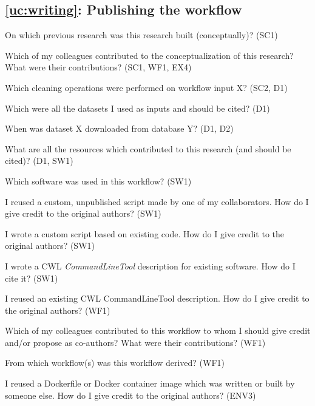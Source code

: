 \subsection{\ref{uc:writing}: Publishing the workflow}
\begin{provquestions}[resume]
    \item On which previous research was this research built (conceptually)? (SC1)
    \item Which of my colleagues contributed to the conceptualization of this research? What were their contributions? (SC1, WF1, EX4)
    \item Which cleaning operations were performed on workflow input X? (SC2, D1)
    \item Which were all the datasets I used as inputs and should be cited? (D1)
    \item When was dataset X downloaded from database Y? (D1, D2)
    \item What are all the resources which contributed to this research (and should be cited)? (D1, SW1)
    \item Which software was used in this workflow? (SW1)
    \item I reused a custom, unpublished script made by one of my collaborators. How do I give credit to the original authors? (SW1)
    \item I wrote a custom script based on existing code. How do I give credit to the original authors? (SW1)
    \item I wrote a CWL \emph{CommandLineTool} description for existing software. How do I cite it? (SW1)
    \item I reused an existing CWL CommandLineTool description. How do I give credit to the original authors? (WF1)
    \item Which of my colleagues contributed to this workflow to whom I should give credit and/or propose as co-authors? What were their contributions? (WF1)
    \item From which workflow(s) was this workflow derived? (WF1)
    \item I reused a Dockerfile or Docker container image which was written or built by someone else. How do I give credit to the original authors? (ENV3)
\end{provquestions}

